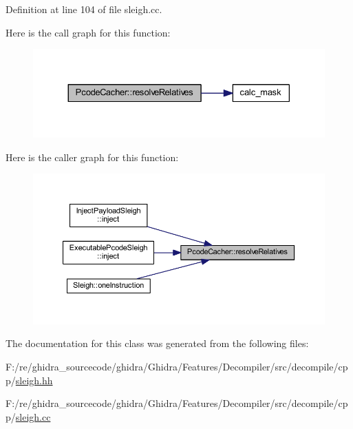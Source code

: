Definition at line 104 of file sleigh.\+cc.

Here is the call graph for this function\+:
\nopagebreak
\begin{figure}[H]
\begin{center}
\leavevmode
\includegraphics[width=330pt]{class_pcode_cacher_a43bb71389841843cc69d3a36d46674f1_cgraph}
\end{center}
\end{figure}
Here is the caller graph for this function\+:
\nopagebreak
\begin{figure}[H]
\begin{center}
\leavevmode
\includegraphics[width=350pt]{class_pcode_cacher_a43bb71389841843cc69d3a36d46674f1_icgraph}
\end{center}
\end{figure}


The documentation for this class was generated from the following files\+:\begin{DoxyCompactItemize}
\item 
F\+:/re/ghidra\+\_\+sourcecode/ghidra/\+Ghidra/\+Features/\+Decompiler/src/decompile/cpp/\mbox{\hyperlink{sleigh_8hh}{sleigh.\+hh}}\item 
F\+:/re/ghidra\+\_\+sourcecode/ghidra/\+Ghidra/\+Features/\+Decompiler/src/decompile/cpp/\mbox{\hyperlink{sleigh_8cc}{sleigh.\+cc}}\end{DoxyCompactItemize}
